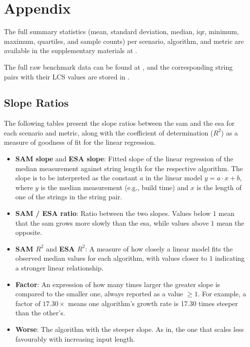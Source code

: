 \chapter*{Appendix}

The full summary statistics (mean, standard deviation, median, \acrshort{iqr}, minimum, maximum, quartiles, and sample counts) per scenario, algorithm, and metric 
are available in the supplementary materials at .

The full raw benchmark data can be found at , and the corresponding string pairs with their LCS values are stored in .


\section*{Slope Ratios}
\label{app:sloperatios}
The following tables present the slope ratios between the \acrshort{sam} and the \acrshort{esa} for each scenario and metric, 
along with the coefficient of determination ($R^2$) as a measure of goodness of fit for the linear regression.

\begin{itemize}
    \item \textbf{SAM slope} and \textbf{ESA slope}: Fitted slope of the linear regression of the median measurement against string length for the respective algorithm. 
    The slope is to be interpreted as the constant $a$ in the linear model $y = a \cdot x + b$, where $y$ is the median measurement (e.g., build time) and $x$ is the length of one of the strings in the string pair.
    \item \textbf{SAM / ESA ratio}: Ratio between the two slopes. Values below $1$ mean that the \acrshort{sam} grows more slowly than the \acrshort{esa}, while values above $1$ mean the opposite.
    \item \textbf{SAM $R^2$} and \textbf{ESA $R^2$}: A measure of how closely a linear model fits the observed median values for each algorithm, with values closer to $1$ indicating a stronger linear relationship.
    \item \textbf{Factor}: An expression of how many times larger the greater slope is compared to the smaller one, always reported as a value $\geq 1$. 
    For example, a factor of $17.30\times$ means one algorithm's growth rate is 17.30 times steeper than the other's.
    \item \textbf{Worse}: The algorithm with the steeper slope. As in, the one that scales less favourably with increasing input length.
\end{itemize}


